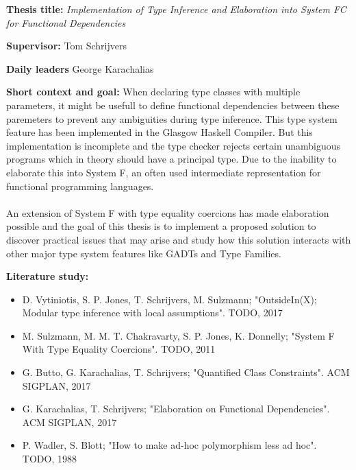 \documentclass[12pt]{report}
\begin{document}
\pagestyle{myheadings}

{\bf Thesis title:} {\em Implementation of Type Inference and Elaboration into System FC for Functional Dependencies}

\vspace{0.5cm}
{\bf Supervisor:} Tom Schrijvers


\vspace{0.5cm}
{\bf Daily leaders} George Karachalias

\vspace{1cm}
{\bf Short context and goal: }
When declaring type classes with multiple parameters, it might be usefull to
define functional dependencies between these paremeters to prevent any
ambiguities during type inference. This type system feature has been implemented
in the Glasgow Haskell Compiler. But this implementation is incomplete and the
type checker rejects certain unambiguous programs which in theory should have a
principal type. Due to the inability to elaborate this into System F, an often
used intermediate representation for functional programming languages.

\paragraph{}
An extension of System F with type equality coercions has made elaboration
possible and the goal of this thesis is to implement a proposed solution to
discover practical issues that may arise and study how this solution interacts
with other major type system features like GADTs and Type Families.

\vspace{1cm}
{\bf Literature study:}
\begin{itemize} %
\item D. Vytiniotis, S. P. Jones, T. Schrijvers, M. Sulzmann; "OutsideIn(X);
    Modular type inference with local assumptions". TODO, 2017
\item M. Sulzmann, M. M. T. Chakravarty, S. P. Jones, K. Donnelly; "System F
    With Type Equality Coercions". TODO, 2011
\item G. Butto, G. Karachalias, T. Schrijvers; "Quantified Class Constraints".
    ACM SIGPLAN, 2017
\item G. Karachalias, T. Schrijvers; "Elaboration on Functional Dependencies".
    ACM SIGPLAN, 2017
\item P. Wadler, S. Blott; "How to make ad-hoc polymorphism less ad hoc". TODO, 1988
\end{itemize}
\end{document}
